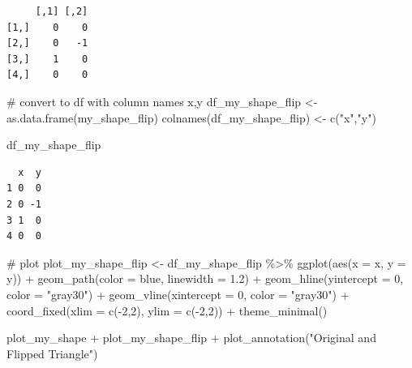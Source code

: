 \documentclass[
  letterpaper,
  DIV=11,
  numbers=noendperiod]{scrartcl}
\newenvironment{Shaded}{\begin{snugshade}}{\end{snugshade}}
\newcommand{\AttributeTok}[1]{\textcolor[rgb]{0.40,0.45,0.13}{#1}}
\newcommand{\CommentTok}[1]{\textcolor[rgb]{0.37,0.37,0.37}{#1}}
\newcommand{\DecValTok}[1]{\textcolor[rgb]{0.68,0.00,0.00}{#1}}
\newcommand{\FloatTok}[1]{\textcolor[rgb]{0.68,0.00,0.00}{#1}}
\newcommand{\FunctionTok}[1]{\textcolor[rgb]{0.28,0.35,0.67}{#1}}
\newcommand{\NormalTok}[1]{\textcolor[rgb]{0.00,0.23,0.31}{#1}}
\newcommand{\OtherTok}[1]{\textcolor[rgb]{0.00,0.23,0.31}{#1}}
\newcommand{\SpecialCharTok}[1]{\textcolor[rgb]{0.37,0.37,0.37}{#1}}
\newcommand{\StringTok}[1]{\textcolor[rgb]{0.13,0.47,0.30}{#1}}
\begin{document}
\begin{verbatim}
     [,1] [,2]
[1,]    0    0
[2,]    0   -1
[3,]    1    0
[4,]    0    0
\end{verbatim}

\begin{Shaded}
\begin{Highlighting}[]
\CommentTok{\# convert to df with column names x,y}
\NormalTok{df\_my\_shape\_flip }\OtherTok{\textless{}{-}} \FunctionTok{as.data.frame}\NormalTok{(my\_shape\_flip)  }
\FunctionTok{colnames}\NormalTok{(df\_my\_shape\_flip) }\OtherTok{\textless{}{-}} \FunctionTok{c}\NormalTok{(}\StringTok{"x"}\NormalTok{,}\StringTok{"y"}\NormalTok{)}

\NormalTok{df\_my\_shape\_flip}
\end{Highlighting}
\end{Shaded}

\begin{verbatim}
  x  y
1 0  0
2 0 -1
3 1  0
4 0  0
\end{verbatim}

\begin{Shaded}
\begin{Highlighting}[]
\CommentTok{\# plot}
\NormalTok{plot\_my\_shape\_flip }\OtherTok{\textless{}{-}}\NormalTok{ df\_my\_shape\_flip }\SpecialCharTok{\%\textgreater{}\%} 
  \FunctionTok{ggplot}\NormalTok{(}\FunctionTok{aes}\NormalTok{(}\AttributeTok{x =}\NormalTok{ x, }\AttributeTok{y =}\NormalTok{ y)) }\SpecialCharTok{+}
  \FunctionTok{geom\_path}\NormalTok{(}\AttributeTok{color =} \StringTok{\textquotesingle{}blue\textquotesingle{}}\NormalTok{, }\AttributeTok{linewidth =} \FloatTok{1.2}\NormalTok{) }\SpecialCharTok{+}
  \FunctionTok{geom\_hline}\NormalTok{(}\AttributeTok{yintercept =} \DecValTok{0}\NormalTok{, }\AttributeTok{color =} \StringTok{"gray30"}\NormalTok{) }\SpecialCharTok{+}
  \FunctionTok{geom\_vline}\NormalTok{(}\AttributeTok{xintercept =} \DecValTok{0}\NormalTok{, }\AttributeTok{color =} \StringTok{"gray30"}\NormalTok{) }\SpecialCharTok{+}
  \FunctionTok{coord\_fixed}\NormalTok{(}\AttributeTok{xlim =} \FunctionTok{c}\NormalTok{(}\SpecialCharTok{{-}}\DecValTok{2}\NormalTok{,}\DecValTok{2}\NormalTok{), }\AttributeTok{ylim =} \FunctionTok{c}\NormalTok{(}\SpecialCharTok{{-}}\DecValTok{2}\NormalTok{,}\DecValTok{2}\NormalTok{)) }\SpecialCharTok{+}
  \FunctionTok{theme\_minimal}\NormalTok{()}

\NormalTok{plot\_my\_shape }\SpecialCharTok{+}\NormalTok{ plot\_my\_shape\_flip }\SpecialCharTok{+} \FunctionTok{plot\_annotation}\NormalTok{(}\StringTok{"Original and Flipped Triangle"}\NormalTok{)}
\end{Highlighting}
\end{Shaded}
\end{document}
